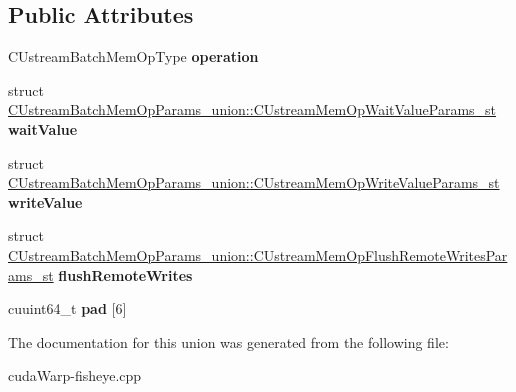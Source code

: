 \subsection*{Public Attributes}
\begin{DoxyCompactItemize}
\item 
C\+Ustream\+Batch\+Mem\+Op\+Type {\bfseries operation}\hypertarget{unionCUstreamBatchMemOpParams__union_ac94836b189a06aa3b3b0c52fc894f235}{}\label{unionCUstreamBatchMemOpParams__union_ac94836b189a06aa3b3b0c52fc894f235}

\item 
struct \hyperlink{structCUstreamBatchMemOpParams__union_1_1CUstreamMemOpWaitValueParams__st}{C\+Ustream\+Batch\+Mem\+Op\+Params\+\_\+union\+::\+C\+Ustream\+Mem\+Op\+Wait\+Value\+Params\+\_\+st} {\bfseries wait\+Value}\hypertarget{unionCUstreamBatchMemOpParams__union_a45cdf1df564e834fbac5234768ace545}{}\label{unionCUstreamBatchMemOpParams__union_a45cdf1df564e834fbac5234768ace545}

\item 
struct \hyperlink{structCUstreamBatchMemOpParams__union_1_1CUstreamMemOpWriteValueParams__st}{C\+Ustream\+Batch\+Mem\+Op\+Params\+\_\+union\+::\+C\+Ustream\+Mem\+Op\+Write\+Value\+Params\+\_\+st} {\bfseries write\+Value}\hypertarget{unionCUstreamBatchMemOpParams__union_aba0a3df12f3c1281f66dbb531b420208}{}\label{unionCUstreamBatchMemOpParams__union_aba0a3df12f3c1281f66dbb531b420208}

\item 
struct \hyperlink{structCUstreamBatchMemOpParams__union_1_1CUstreamMemOpFlushRemoteWritesParams__st}{C\+Ustream\+Batch\+Mem\+Op\+Params\+\_\+union\+::\+C\+Ustream\+Mem\+Op\+Flush\+Remote\+Writes\+Params\+\_\+st} {\bfseries flush\+Remote\+Writes}\hypertarget{unionCUstreamBatchMemOpParams__union_a161b846cdbc8a084bef2ee77431c0ef8}{}\label{unionCUstreamBatchMemOpParams__union_a161b846cdbc8a084bef2ee77431c0ef8}

\item 
cuuint64\+\_\+t {\bfseries pad} \mbox{[}6\mbox{]}\hypertarget{unionCUstreamBatchMemOpParams__union_a3ada0404ec293d070deb48c294caaf84}{}\label{unionCUstreamBatchMemOpParams__union_a3ada0404ec293d070deb48c294caaf84}

\end{DoxyCompactItemize}


The documentation for this union was generated from the following file\+:\begin{DoxyCompactItemize}
\item 
cuda\+Warp-\/fisheye.\+cpp\end{DoxyCompactItemize}
